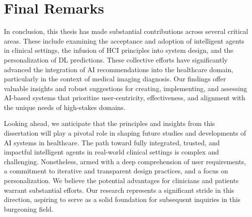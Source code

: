 \section{Final Remarks}
\label{sec:chap008004}

\textcolor{revised}{In conclusion, this thesis has made substantial contributions across several critical areas.
These include examining the acceptance and adoption of intelligent agents in clinical settings, the infusion of \ac{HCI} principles into system design, and the personalization of \ac{DL} predictions.
These collective efforts have significantly advanced the integration of \ac{AI} recommendations into the healthcare domain, particularly in the context of medical imaging diagnosis.
Our findings offer valuable insights and robust suggestions for creating, implementing, and assessing \acs{AI}-based systems that prioritize user-centricity, effectiveness, and alignment with the unique needs of high-stakes domains.}

\textcolor{revised}{Looking ahead, we anticipate that the principles and insights from this dissertation will play a pivotal role in shaping future studies and developments of \ac{AI} systems in healthcare.
The path toward fully integrated, trusted, and impactful intelligent agents in real-world clinical settings is complex and challenging.
Nonetheless, armed with a deep comprehension of user requirements, a commitment to iterative and transparent design practices, and a focus on personalization.
We believe the potential advantages for clinicians and patients warrant substantial efforts.
Our research represents a significant stride in this direction, aspiring to serve as a solid foundation for subsequent inquiries in this burgeoning field.}